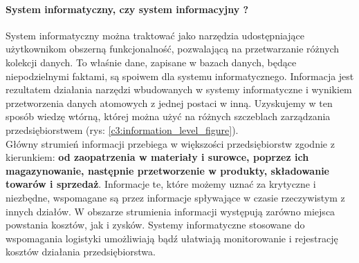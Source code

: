 		\paragraph{System informatyczny, czy system informacyjny ?}
		System informatyczny można traktować jako narzędzia udostępniające użytkownikom 
		obszerną funkcjonalność, pozwalającą na przetwarzanie różnych kolekcji danych.
		To właśnie dane, zapisane w bazach danych, będące niepodzielnymi faktami, są 
		spoiwem dla systemu informatycznego. Informacja jest rezultatem działania
		narzędzi wbudowanych w systemy informatyczne i wynikiem przetwo\-rzenia danych 
		atomowych z jednej postaci w inną. Uzyskujemy w ten sposób wiedzę wtórną, której można 
		użyć na różnych szczeblach zarządzania przedsiębiorstwem (rys: \ref{c3:information_level_figure}). \\
		
		Główny strumień informacji przebiega w większości przedsiębiorstw zgodnie z kierunkiem: 
		\textbf{od zaopatrzenia w materiały i surowce, poprzez ich magazynowanie, następnie przetwo\-rzenie 
		w produkty, składowanie towarów i sprzedaż}. Informacje te, które możemy uznać za krytyczne
		i niezbędne, wspomagane są przez informacje spływające w czasie rzeczywistym z innych działów. 
		W obszarze strumienia informacji występują zarówno miejsca powstania kosztów, jak i zysków. 
		Systemy informatyczne stosowane do wspomagania logistyki umożliwiają bądź ułatwiają monitorowanie
		i rejestrację kosztów działania przedsiębiorstwa. 
		
